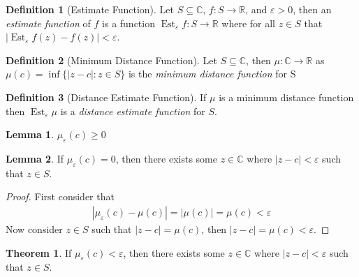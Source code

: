 \documentclass[12pt]{article}
\DeclareMathOperator{\est}{Est}
\theoremstyle{definition}
\newtheorem{definition}{Definition}
\theoremstyle{definition}
\newtheorem{theorem}{Theorem}
\theoremstyle{definition}
\newtheorem{lemma}{Lemma}
\theoremstyle{definition}
\begin{document}
\begin{flushleft}

\begin{definition}[Estimate Function]
    Let $S \subseteq \mathbb{C}$, $f\colon S\to\mathbb{R}$, and $\varepsilon > 0$, then an \textit{estimate function} of $f$ is a function $\est_\varepsilon f\colon S\to\mathbb{R}$ where for all $z \in S$ that $\left|\est_\varepsilon f(z) - f(z)\right| < \varepsilon$.
\end{definition}

\begin{definition}[Minimum Distance Function]
    Let $S \subseteq \mathbb{C}$, then $\mu\colon\mathbb{C}\to\mathbb{R}$ as $\mu(c) = \inf\{ |z - c| : z \in S \}$ is the \textit{minimum distance function} for S
\end{definition}

\begin{definition}[Distance Estimate Function]
    If $\mu$ is a minimum distance function then $\est_\varepsilon\mu$ is a \textit{distance estimate function} for $S$.
\end{definition}

\begin{lemma}
    $\mu_\varepsilon(c) \geq 0$
\end{lemma}

\begin{lemma}
    If $\mu_\varepsilon(c) = 0$, then there exists some $z \in \mathbb{C}$ where $|z - c| < \varepsilon$ such that $z \in S$.
\end{lemma}
\begin{proof}
    First consider that
    \begin{align*}
        |\mu_\varepsilon(c) - \mu(c)| = |\mu(c)| = \mu(c) < \varepsilon
    \end{align*}
    Now consider $z \in S$ such that $|z - c| = \mu(c)$, then $|z - c| = \mu(c) < \varepsilon$.
\end{proof}

\begin{theorem}
    If $\mu_\varepsilon(c) < \varepsilon$, then there exists some $z \in \mathbb{C}$ where $|z - c| < \varepsilon$ such that $z \in S$.
\end{theorem}


\end{flushleft}
\end{document}
